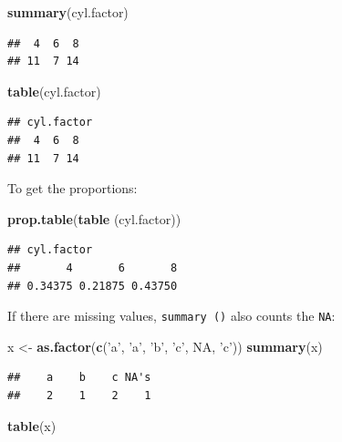 \documentclass[]{book}
\newenvironment{Shaded}{\begin{snugshade}}{\end{snugshade}}
\newcommand{\KeywordTok}[1]{\textcolor[rgb]{0.13,0.29,0.53}{\textbf{#1}}}
\newcommand{\NormalTok}[1]{#1}
\newcommand{\OtherTok}[1]{\textcolor[rgb]{0.56,0.35,0.01}{#1}}
\newcommand{\StringTok}[1]{\textcolor[rgb]{0.31,0.60,0.02}{#1}}
\begin{document}
\begin{Shaded}
\begin{Highlighting}[]
\KeywordTok{summary}\NormalTok{(cyl.factor)}
\end{Highlighting}
\end{Shaded}

\begin{verbatim}
##  4  6  8 
## 11  7 14
\end{verbatim}

\begin{Shaded}
\begin{Highlighting}[]
\KeywordTok{table}\NormalTok{(cyl.factor)}
\end{Highlighting}
\end{Shaded}

\begin{verbatim}
## cyl.factor
##  4  6  8 
## 11  7 14
\end{verbatim}

To get the proportions:

\begin{Shaded}
\begin{Highlighting}[]
\KeywordTok{prop.table}\NormalTok{(}\KeywordTok{table}\NormalTok{ (cyl.factor))}
\end{Highlighting}
\end{Shaded}

\begin{verbatim}
## cyl.factor
##       4       6       8 
## 0.34375 0.21875 0.43750
\end{verbatim}

If there are missing values, \texttt{summary\ ()} also counts the \texttt{NA}:

\begin{Shaded}
\begin{Highlighting}[]
\NormalTok{x <-}\StringTok{ }\KeywordTok{as.factor}\NormalTok{(}\KeywordTok{c}\NormalTok{(}\StringTok{'a'}\NormalTok{, }\StringTok{'a'}\NormalTok{, }\StringTok{'b'}\NormalTok{, }\StringTok{'c'}\NormalTok{, }\OtherTok{NA}\NormalTok{, }\StringTok{'c'}\NormalTok{))}
\KeywordTok{summary}\NormalTok{(x)}
\end{Highlighting}
\end{Shaded}

\begin{verbatim}
##    a    b    c NA's 
##    2    1    2    1
\end{verbatim}

\begin{Shaded}
\begin{Highlighting}[]
\KeywordTok{table}\NormalTok{(x)}
\end{Highlighting}
\end{Shaded}
\end{document}
